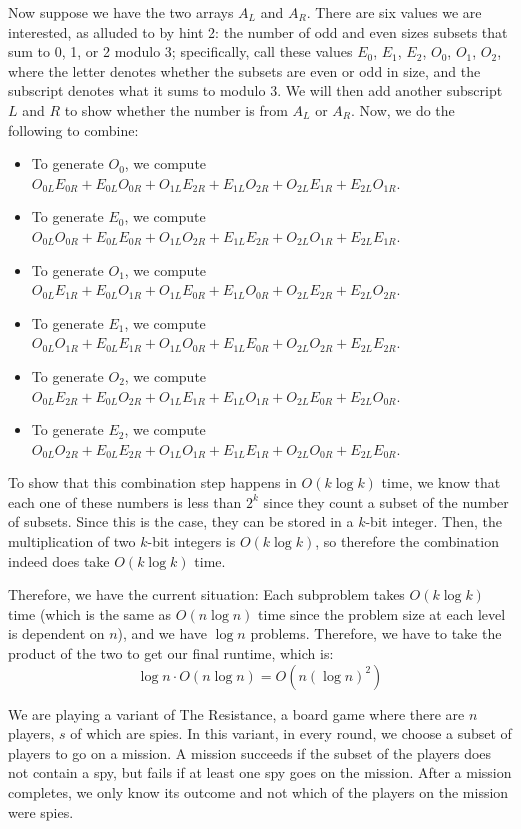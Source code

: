 \documentclass[11pt]{article}
\begin{document}
\begin{solution}
	Now suppose we have the two arrays $A_L$ and $A_R$. There are six values we are interested, as alluded to by
	hint 2: the number of odd and even sizes subsets that sum to 0, 1, or 2 modulo 3; specifically, call these 
	values $E_0$, $E_1$, $E_2$, $O_0$, $O_1$, $O_2$, where the letter denotes whether the subsets are even or 
	odd in size, and the subscript denotes what it sums to modulo 3. We will then add another subscript $L$ 
	and $R$ to show whether the number is from $A_L$ or $A_R$. Now, we do the following to combine: 
	\begin{itemize}
		\item To generate $O_0$, we compute $O_{0L}E_{0R} + E_{0L}O_{0R} + O_{1L}E_{2R} + E_{1L}O_{2R} +
			O_{2L}E_{1R} + E_{2L}O_{1R}$.
		\item To generate $E_0$, we compute $O_{0L}O_{0R} + E_{0L}E_{0R} + O_{1L}O_{2R} + E_{1L}E_{2R} + 
			O_{2L}O_{1R} + E_{2L}E_{1R}$. 
		\item To generate $O_1$, we compute $O_{0L}E_{1R} + E_{0L}O_{1R} + O_{1L}E_{0R} + E_{1L}O_{0R} + 
			O_{2L}E_{2R} + E_{2L}O_{2R}$.
		\item To generate $E_1$, we compute $O_{0L}O_{1R} + E_{0L}E_{1R} + O_{1L}O_{0R} + E_{1L}E_{0R} +
			O_{2L}O_{2R} + E_{2L}E_{2R}$.
		\item To generate $O_2$, we compute $O_{0L}E_{2R} + E_{0L}O_{2R} + O_{1L}E_{1R} + E_{1L}O_{1R} +
			O_{2L}E_{0R} + E_{2L}O_{0R}$.
		\item To generate $E_2$, we compute $O_{0L}O_{2R} + E_{0L}E_{2R} + O_{1L}O_{1R} + E_{1L}E_{1R} +
			O_{2L}O_{0R} + E_{2L}E_{0R}$.	
	\end{itemize}
	To show that this combination step happens in $O(k \log k)$ time, we know that each one of these numbers 
	is less than $2^k$ since they count a subset of the number of subsets. Since this is the case, they 
	can be stored in a $k$-bit integer. Then, the multiplication of two $k$-bit integers is $O(k \log k)$, 
	so therefore the combination indeed does take $O(k \log k)$ time. 

	Therefore, we have the current situation: Each subproblem takes $O(k \log k)$ time (which is the same as 
	$O(n \log n)$ time since the problem size at each level is dependent on $n$), and we have $\log n$ problems.
	Therefore, we have to take the product of the two to get our final runtime, which is:
	\[
		\log n \cdot O(n \log n) = O(n (\log n)^2)
	\] 
\end{solution}
\pagebreak
{}

We are playing a variant of The Resistance, a board game where there are $n$ players, $s$ of which are spies. In this variant, in every round, we choose a subset of players to go on a mission. A mission succeeds if the subset of the players does not contain a spy, but fails if at least one spy goes on the mission. After a mission completes, we only know its outcome and not which of the players on the mission were spies.
\end{document}

